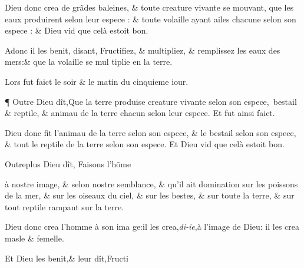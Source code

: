 \documentclass[twocolumn,paper=a4,pagesize=pdftex,12pt,headinclude=on]{scrbook}
\newcounter{verse}
\newcommand{\bverse}{%
  \addtocounter{verse}{1}
  \theverse\quad
}
\let\lb\linebreak
\begin{document}
\bverse Dieu donc
\footnotemarkmain{}crea de gr\~ades baleines,
\& toute creature vivante se mouvant,
que les eaux produirent selon leur es\-pece :
\& toute volaille ayant ailes chacune selon son espece : 
\& Dieu vid \lb
 que celà estoit bon.

\bverse Adonc \footnotemarkmain{}il les benit, disant, Fructi\-fiez,
\& multipliez, \& remplissez les
eaux des mers:\& que la volaille se mul \lb
tiplie en la terre.

\bverse Lors fut faict le soir \& le matin du
cinquieme iour.

\bverse ¶ Outre Dieu dît,Que la terre produise
creature vivante selon son espe\-ce,~bestail
 \& reptile, \& animau de la
terre chacun selon leur espece. Et fut
ainsi faict.

\bverse Dieu donc fit l'animau de la terre
selon son espece, \& le bestail selon son
espece, \& tout le reptile de la terre se\-lon
son espece. Et Dieu vid que celà
estoit bon.

\bverse Outreplus Dieu dît,
\footnotemarkmain{}Faisons
\footnotemarkmain{}l'h\~o\-me
\addtocounter{footnotemain}{1}%
à \footnotemarkverse{}\footnotemarkmain{} nostre image,
\& selon nostre
semblance, \& qu'il ait domination sur
les poissons de la mer, \& sur les oi\-seaux
du ciel, \& sur les bestes, \& sur
toute la terre, \& sur tout reptile ram\-pant
sur la terre.
\addtocounter{footnotemain}{1}%

\bverse Dieu donc crea l'homme à son ima \lb
ge:\footnotemarkverse{}\footnotemarkmain{}il les
crea,\emph{di-ie},à l'image de Dieu:
\footnotemarkverse{}il les crea masle \& femelle.

\bverse Et Dieu les benit,\& leur dît,\footnotemarkmain{}Fructi
\end{document}
